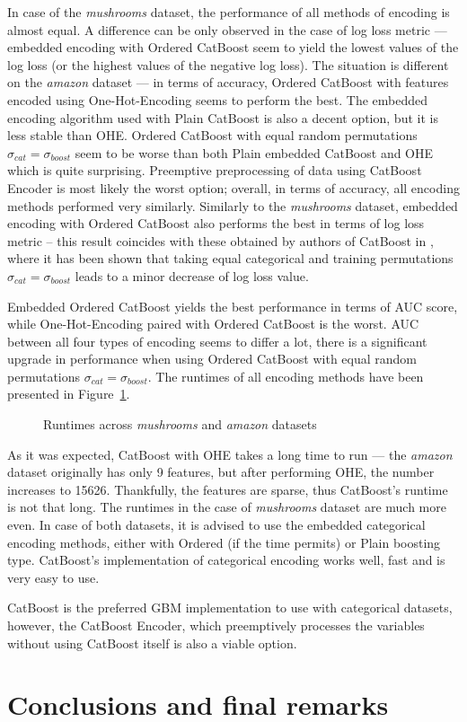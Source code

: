 \documentclass[magisterska, english]{pwr_wmat_praca_dyplomowa}
\theoremstyle{plain}
\numberwithin{theorem}{chapter}
\theoremstyle{definition}
\numberwithin{theorem}{chapter}
\begin{document}
In case of the \emph{mushrooms} dataset, the performance of all methods of encoding is almost equal. A difference can be only observed in the case of log loss metric --- embedded encoding with Ordered CatBoost seem to yield the lowest values of the log loss (or the highest values of the negative log loss). The situation is different on the \emph{amazon} dataset --- in terms of accuracy, Ordered CatBoost with features encoded using One-Hot-Encoding seems to perform the best. The embedded encoding algorithm used with Plain CatBoost  is also a decent option, but it is less stable than OHE. Ordered CatBoost with equal random permutations $\sigma_{cat} = \sigma_{boost}$ seem to be worse than both Plain embedded CatBoost and OHE which is quite surprising. Preemptive preprocessing of data using CatBoost Encoder is most likely the worst option; overall, in terms of accuracy, all encoding methods performed very similarly. Similarly to the \emph{mushrooms} dataset, embedded encoding with Ordered CatBoost also performs the best in terms of log loss metric -- this result coincides with these obtained by authors of CatBoost in \cite{catboost}, where it has been shown that taking equal categorical and training permutations $\sigma_{cat} = \sigma_{boost}$ leads to a minor decrease of log loss value.

Embedded Ordered CatBoost yields the best performance in terms of AUC score, while One-Hot-Encoding paired with Ordered CatBoost is the worst. AUC between all four types of encoding seems to differ a lot, there is a significant upgrade in performance when using Ordered CatBoost with equal random permutations $\sigma_{cat} = \sigma_{boost}$. The runtimes of all encoding methods have been presented in Figure~\ref{fig:catboost_categorical_runtimes}.

\begin{figure}[H]
	\centering
	\caption{Runtimes across \emph{mushrooms} and \emph{amazon} datasets}
	\label{fig:catboost_categorical_runtimes}
\end{figure}

As it was expected, CatBoost with OHE takes a long time to run --- the \emph{amazon} dataset originally has only 9 features, but after performing OHE, the number increases to 15626. Thankfully, the features are sparse, thus CatBoost's runtime is not that long. The runtimes in the case of \emph{mushrooms} dataset are much more even. In case of both datasets, it is advised to use the embedded categorical encoding methods, either with Ordered (if the time permits) or Plain boosting type. CatBoost's implementation of categorical encoding works well, fast and is very easy to use. 

CatBoost is the preferred GBM implementation to use with categorical datasets, however, the CatBoost Encoder, which preemptively processes the variables without using CatBoost itself is also a viable option.

\chapter{Conclusions and final remarks}



\newpage
\nocite{*} 
\end{document}
